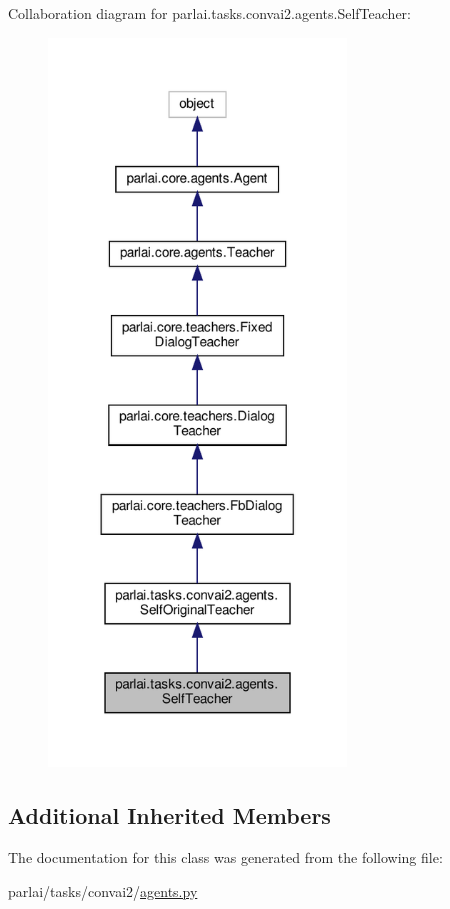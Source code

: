 Collaboration diagram for parlai.\+tasks.\+convai2.\+agents.\+Self\+Teacher\+:
\nopagebreak
\begin{figure}[H]
\begin{center}
\leavevmode
\includegraphics[width=224pt]{classparlai_1_1tasks_1_1convai2_1_1agents_1_1SelfTeacher__coll__graph}
\end{center}
\end{figure}
\subsection*{Additional Inherited Members}


The documentation for this class was generated from the following file\+:\begin{DoxyCompactItemize}
\item 
parlai/tasks/convai2/\hyperlink{parlai_2tasks_2convai2_2agents_8py}{agents.\+py}\end{DoxyCompactItemize}
